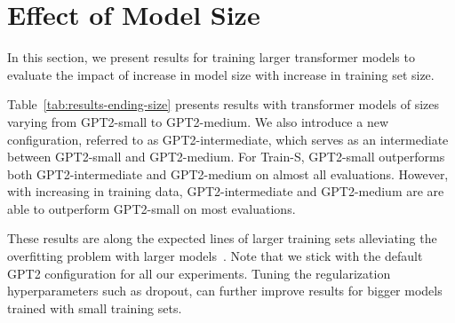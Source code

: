 \section{Effect of Model Size}

In this section, we present results for training larger transformer models to evaluate the impact of increase in model size with increase in training set size.




Table~\ref{tab:results-ending-size} presents results with transformer models of sizes varying from GPT2-small to GPT2-medium.
We also introduce a new configuration, referred to as GPT2-intermediate, which serves as an intermediate between GPT2-small and GPT2-medium.
For Train-S, GPT2-small outperforms both GPT2-intermediate and GPT2-medium on almost all evaluations.
However, with increasing in training data,  GPT2-intermediate and GPT2-medium are are able to
outperform GPT2-small on most evaluations. 

These results are along the expected lines of larger training sets alleviating the overfitting problem with larger models~\citep{kaplan2020scaling}.  
Note that we stick with the default GPT2 configuration for all our experiments. Tuning the regularization hyperparameters such as dropout, can further improve results for bigger models trained with small training sets. 






